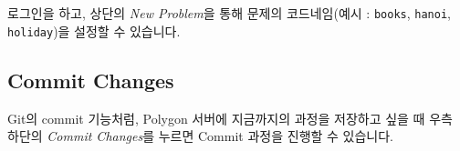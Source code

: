 \documentclass{article}
\begin{document}
    로그인을 하고, 상단의 \textit{New Problem}을 통해 문제의 코드네임(예시 : \verb|books|, \verb|hanoi|, \verb|holiday|)을 설정할 수 있습니다.
    \subsection*{Commit Changes}
    Git의 commit 기능처럼, Polygon 서버에 지금까지의 과정을 저장하고 싶을 때 우측 하단의 \textit{Commit Changes}를 누르면 Commit 과정을 진행할 수 있습니다.
\end{document}
